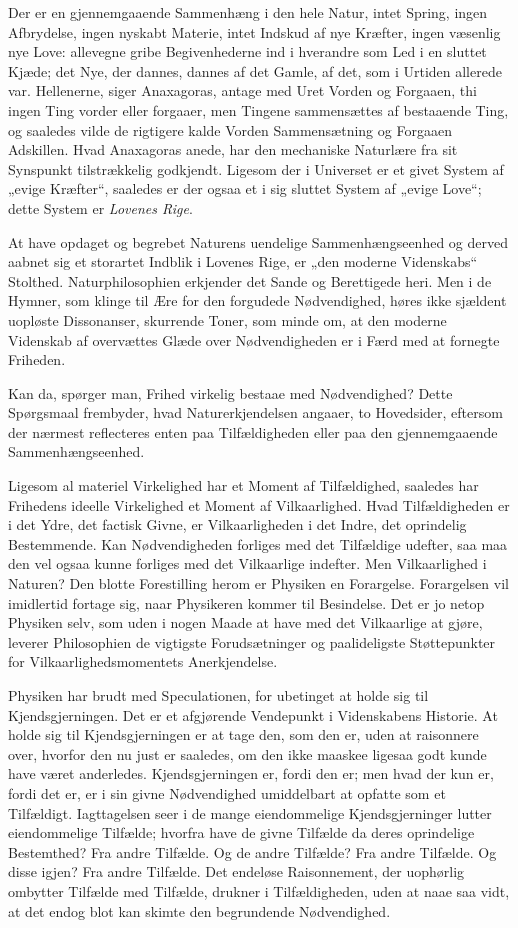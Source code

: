 \documentclass[12pt,a4paper]{book}
\begin{document}
Der er en gjennemgaaende Sammenhæng i den hele Natur,
intet Spring, ingen Afbrydelse, ingen nyskabt Materie, intet
Indskud af nye Kræfter, ingen væsenlig nye Love: allevegne gribe
Begivenhederne ind i hverandre som Led i en sluttet Kjæde; det
Nye, der dannes, dannes af det Gamle, af det, som i Urtiden
allerede var. Hellenerne, siger Anaxagoras, antage med Uret
Vorden og Forgaaen, thi ingen Ting vorder eller forgaaer, men
Tingene sammensættes af bestaaende Ting, og saaledes vilde de
rigtigere kalde Vorden Sammensætning og Forgaaen Adskillen.
Hvad Anaxagoras anede, har den mechaniske Naturlære fra sit
Synspunkt tilstrækkelig godkjendt. Ligesom der i Universet er et
givet System af „evige Kræfter“, saaledes er der ogsaa et i sig
sluttet System af „evige Love“; dette System er
\emph{Lovenes Rige}.

At have opdaget og begrebet Naturens uendelige
Sammenhængseenhed og derved aabnet sig et storartet Indblik i
Lovenes Rige, er „den moderne Videnskabs“ Stolthed.
Naturphilosophien erkjender det Sande og Berettigede heri. Men i de
Hymner, som klinge til Ære for den forgudede Nødvendighed,
høres ikke sjældent uopløste Dissonanser, skurrende Toner, som
minde om, at den moderne Videnskab af overvættes Glæde over
Nødvendigheden er i Færd med at fornegte Friheden.

Kan da, spørger man, Frihed virkelig bestaae med
Nødvendighed? Dette Spørgsmaal frembyder, hvad Naturerkjendelsen
angaaer, to Hovedsider, eftersom der nærmest reflecteres enten paa
Tilfældigheden eller paa den gjennemgaaende Sammenhængseenhed.

Ligesom al materiel Virkelighed har et Moment af
Tilfældighed, saaledes har Frihedens ideelle Virkelighed et Moment af
Vilkaarlighed. Hvad Tilfældigheden er i det Ydre, det factisk
Givne, er Vilkaarligheden i det Indre, det oprindelig Bestemmende.
Kan Nødvendigheden forliges med det Tilfældige udefter, saa maa
den vel ogsaa kunne forliges med det Vilkaarlige indefter. Men
Vilkaarlighed i Naturen? Den blotte Forestilling herom er
Physiken en Forargelse. Forargelsen vil imidlertid fortage sig, naar
Physikeren kommer til Besindelse. Det er jo netop Physiken selv,
som uden i nogen Maade at have med det Vilkaarlige at gjøre,
leverer Philosophien de vigtigste Forudsætninger og paalideligste
Støttepunkter for Vilkaarlighedsmomentets Anerkjendelse.

Physiken har brudt med Speculationen, for ubetinget at holde
sig til Kjendsgjerningen. Det er et afgjørende Vendepunkt i
Videnskabens Historie. At holde sig til Kjendsgjerningen er at
tage den, som den er, uden at raisonnere over, hvorfor den nu
just er saaledes, om den ikke maaskee ligesaa godt kunde have
været anderledes. Kjendsgjerningen er, fordi den er; men hvad
der kun er, fordi det er, er i sin givne Nødvendighed umiddelbart
at opfatte som
et Tilfældigt. Iagttagelsen seer i de mange eiendommelige
Kjendsgjerninger lutter eiendommelige Tilfælde; hvorfra have de
givne Tilfælde da deres oprindelige Bestemthed? Fra andre
Tilfælde. Og de andre Tilfælde? Fra andre Tilfælde. Og disse
igjen? Fra andre Tilfælde. Det endeløse Raisonnement, der
uophørlig ombytter Tilfælde med Tilfælde, drukner i Tilfældigheden,
uden at naae saa vidt, at det endog blot kan skimte den
begrundende Nødvendighed.
\end{document}
